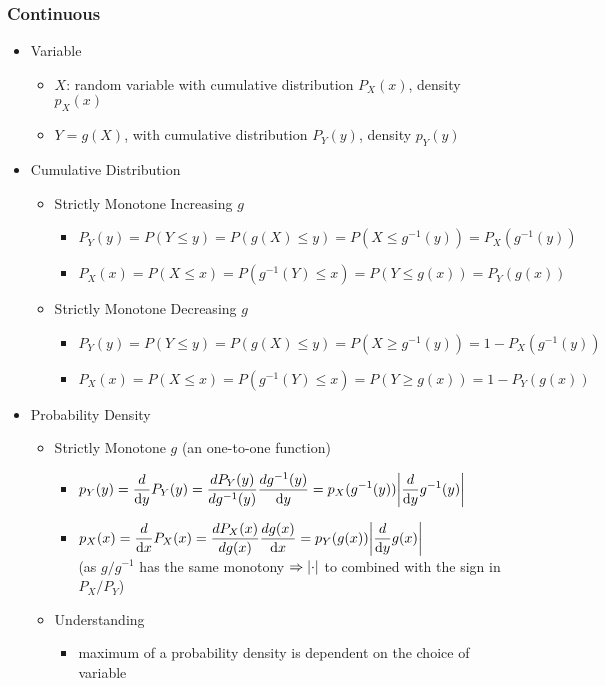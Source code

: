 \subsubsection{Continuous}
\begin{itemize}
\item Variable
	\begin{itemize}
	\item $X$: random variable with cumulative distribution $P_X(x)$, density $p_X(x)$
	\item $Y=g(X)$, with cumulative distribution $P_Y(y)$, density $p_Y(y)$
	\end{itemize}

\item Cumulative Distribution
	\begin{itemize}
	\item Strictly Monotone Increasing $g$
		\begin{itemize}
		\item $P_Y(y) = P(Y\le y) = P(g(X) \le y) = P(X \le g^{-1}(y)) = P_X(g^{-1}(y))$
		\item $P_X(x) = P(X\le x) = P(g^{-1}(Y) \le x) = P(Y \le g(x)) = P_Y(g(x))$
		\end{itemize}
	\item Strictly Monotone Decreasing $g$
		\begin{itemize}
		\item $P_Y(y) = P(Y\le y) = P(g(X) \le y) = P(X \ge g^{-1}(y)) = 1 - P_X(g^{-1}(y))$
		\item $P_X(x) = P(X\le x) = P(g^{-1}(Y) \le x) = P(Y \ge g(x)) = 1 - P_Y(g(x))$
		\end{itemize}
	\end{itemize}

\item Probability Density
	\begin{itemize}
	\item Strictly Monotone $g$ (an one-to-one function)
		\begin{itemize}
		\item $\displaystyle p_Y(y) = \frac d {\D y} P_Y(y) = \frac {d P_Y(y)}{d\space  g^{-1}(y)} \frac{d \space g^{-1}(y)}{\D y} = p_X(g^{-1}(y)) \abs*{\frac{d}{\D y} g^{-1}(y)}$
		\item $\displaystyle p_X(x) = \frac d {\D x} P_X(x) = \frac {d P_X(x)}{d\space  g(x)} \frac{d \space g(x)}{\D x} = p_Y(g(x)) \abs*{\frac{d}{\D y} g(x)}$ \\
		(as $g/g^{-1}$ has the same monotony $\Rightarrow\abs*\cdot$ to combined with the sign in $P_X/P_Y$)
		\end{itemize}
	\item Understanding
		\begin{itemize}
		\item maximum of a probability density is dependent on the choice of variable
		\end{itemize}
	\end{itemize}
\end{itemize}


